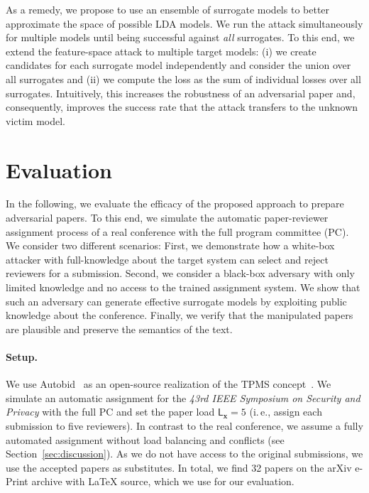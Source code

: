 \documentclass[letterpaper,twocolumn,10pt]{article}
\newcommand{\ie}{i.\,e.}
\newcommand{\bow}{\textbf{x}}
\newcommand{\submission}{\bow}
\newcommand{\paperload}{\mathsf{L}_{\submission}}
\begin{document}
As a {remedy\EndAccSupp{}}, we propose to use an {ensemble\EndAccSupp{}} of {surrogate\EndAccSupp{}} models to better approximate the space of possible {LDA\EndAccSupp{}} models. 
We run the attack simultaneously for multiple models until being successful against \emph{all} surrogates. To this end, we extend the feature-space attack to multiple target models: (i) we create candidates for each {surrogate\EndAccSupp{}} model independently and consider the union over all {surrogates\EndAccSupp{}} and (ii) we compute the loss as the sum of individual losses over all surrogates. 
Intuitively, this increases the robustness of an adversarial paper and, consequently, improves the success rate that the attack transfers to the unknown victim model. 
 \vspace{-0.25em}
\section{Evaluation}
\label{sec:evaluation}

In the following, we evaluate the efficacy of the proposed approach to prepare adversarial papers. To this end, we simulate the automatic paper-reviewer assignment process of a real conference with the full program {committee\EndAccSupp{}} (PC). 
We consider two different scenarios:
First, we demonstrate how a white-box attacker with full-knowledge about the target system can select and reject reviewers for a submission.
Second, we consider a black-box adversary with only limited knowledge and no access to the trained assignment system. We show that such an adversary can generate effective {surrogate\EndAccSupp{}} models by exploiting public knowledge about the conference.
Finally, we verify that the manipulated papers are {plausible\EndAccSupp{}} and preserve the semantics of the text.

\paragraph{Setup.} 
We use Autobid~\cite{misc-autobid} as an open-source realization of the TPMS concept~\cite{charlin-13-toronto}. We simulate an automatic assignment for the \emph{43rd IEEE Symposium on Security and Privacy} with the full PC and set the paper load $\paperload = 5$ (\ie, assign each submission to five reviewers). In contrast to the real conference, we assume a fully automated assignment without load balancing and conflicts (see Section~\ref{sec:discussion}).
As we do not have access to the original submissions, we use the accepted papers as substitutes. In total, we find 32 papers on the arXiv e-Print archive with \LaTeX{} source, which we use for our evaluation.
\end{document}
